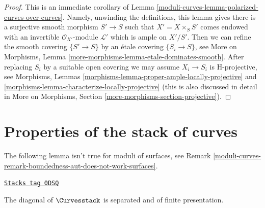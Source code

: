 \begin{proof}
This is an immediate corollary of
Lemma \ref{moduli-curves-lemma-polarized-curves-over-curves}.
Namely, unwinding the definitions, this lemma gives there is a
surjective smooth morphism $S' \to S$ such that $X' = X \times_S S'$
comes endowed with an invertible $\mathcal{O}_{X'}$-module
$\mathcal{L}'$ which is ample on $X'/S'$.
Then we can refine the smooth covering $\{S' \to S\}$
by an \'etale covering $\{S_i \to S\}$, see
More on Morphisms, Lemma \ref{more-morphisms-lemma-etale-dominates-smooth}.
After replacing $S_i$ by a suitable open covering we may assume
$X_i \to S_i$ is H-projective, see
Morphisms, Lemmas \ref{morphisms-lemma-proper-ample-locally-projective} and
\ref{morphisms-lemma-characterize-locally-projective}
(this is also discussed in detail in
More on Morphisms, Section \ref{more-morphisms-section-projective}).
\end{proof}

\section{Properties of the stack of curves}
\label{moduli-curves-section-properties}
The following lemma isn't true for moduli of surfaces, see
Remark \ref{moduli-curves-remark-boundedness-aut-does-not-work-surfaces}.

\begin{lemma}
\label{moduli-curves-lemma-curves-diagonal-separated-fp}
\href{https://stacks.math.columbia.edu/tag/0DSQ}{\texttt{Stacks tag 0DSQ}}

The diagonal of $\Curvesstack$ is separated
and of finite presentation.
\end{lemma}

